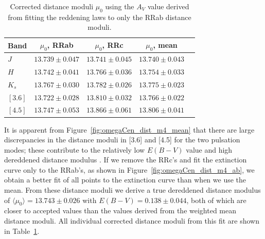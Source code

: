 \documentclass[a4paper,fleqn,usenatbib]{mnras}
\begin{document}
\endgroup

\begin{table}
\centering
\caption{Corrected distance moduli $\mu_0$ using the $A_V$ value derived from fitting the reddening laws to only the RRab distance moduli.}
\label{tab:dist_mod_ab}
\begin{tabular}{l||c|c|c|r} 
\hline \hline
Band & $\mu_0$, RRab & $\mu_0$, RRc & $\mu_0$, mean \\
\hline
$J$ & $13.739 \pm 0.047$ & $13.741 \pm 0.045$ & $13.740 \pm 0.043$ \\
$H$ & $13.742 \pm 0.041$ & $13.766 \pm 0.036$ & $13.754 \pm 0.033$ \\
$K_s$ & $13.767 \pm 0.030$ & $13.782 \pm 0.026$ & $13.775 \pm 0.023$ \\
$[3.6]$ & $13.722 \pm 0.028$ & $13.810 \pm 0.032$ & $13.766 \pm 0.022$ \\
$[4.5]$ & $13.747 \pm 0.053$ & $13.866 \pm 0.061$ & $13.806 \pm 0.041$ \\
\hline
\end{tabular}
\end{table}

It is apparent from Figure~\ref{fig:omegaCen_dist_m4_mean} that there are large discrepancies in the distance moduli in [3.6] and [4.5] for the two pulsation modes; these contribute to the relatively low $E(B-V)$ value and high dereddened distance modulus \citep{2002ASPC..265...95L, 2006ApJ...652..362D}. 
If we remove the RRc's and fit the extinction curve only to the RRab's, as shown in Figure~\ref{fig:omegaCen_dist_m4_ab}, we obtain a better fit of all points to the extinction curve than when we use the mean. From these distance moduli we derive a true dereddened distance modulus of $\langle \mu_0 \rangle = 13.743 \pm 0.026$ with $E(B-V) = 0.138 \pm 0.044$, both of which are closer to accepted values than the values derived from the weighted mean distance moduli. All individual corrected distance moduli from this fit are shown in Table~\ref{tab:dist_mod_ab}.
\end{document}
